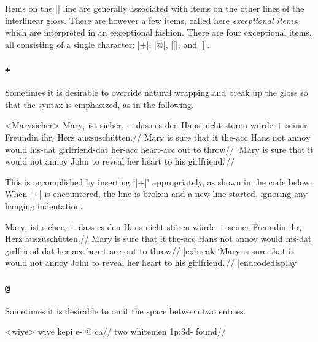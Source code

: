Items on the |\gla| line are generally associated with items on
the other lines of the interlinear gloss.  There are however a
few items, called here {\it exceptional items}, which are
interpreted in an exceptional fashion. There are four exceptional
items, all consisting of a single character: |+|, |@|, |[|, and
|]|.

\subsubsection {\tt +}

%
Sometimes it is desirable to override natural wrapping and
break up the gloss so that the syntax is emphasized, as in the
following.

\framedisplay
\ex<Marysicher>
\begingl
\gla Mary$_i$ ist sicher, + dass es den Hans nicht st\"oren w\"urde
+ seiner Freundin ihr$_i$ Herz auszusch\"utten.//
\glb Mary is sure that it the-{\sc acc} Hans not annoy would
his-{\sc dat} girlfriend-{\sc dat} her-{\sc acc} heart-{\sc acc} {out to
throw}//
\glft  `Mary is sure that it would not annoy John to reveal her
heart to his girlfriend.'//
\endgl
\xe
\endframedisplay

\bigskip
This is accomplished by inserting `|+|' appropriately, as shown in the
code below.  When |+| is encountered, the line is broken and a new
line started, ignoring any hanging indentation.

\codedisplay
\ex\begingl
\gla Mary$_i$ ist sicher, + dass es den Hans nicht st\"oren w\"urde
+ seiner Freundin ihr$_i$ Herz auszusch\"utten.//
\glb Mary is sure that it the-{\sc acc} Hans not annoy would
his-{\sc dat} girlfriend-{\sc dat} her-{\sc acc} heart-{\sc acc} {out to
throw}//
|exbreak
\glft  `Mary is sure that it would not annoy John to reveal her
heart to his girlfriend.'//
\endgl
\xe
|endcodedisplay

\subsubsection {\tt @}

%
Sometimes it is desirable to omit the space between two entries.

\framedisplay
\ex<wiye>
\begingl
\gla wiye kepi e- @ ca//
\glb two whitemen {\sc 1p:3d}- found//
\endgl
\xe
\endframedisplay

